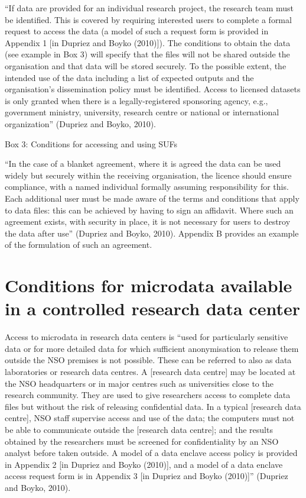 \documentclass[letterpaper,10pt,english]{sphinxmanual}
\begin{document}
“If data are provided for an individual research project, the research
team must be identified. This is covered by requiring interested users
to complete a formal request to access the data (a model of such a
request form is provided in Appendix 1 {[}in Dupriez and Boyko (2010){]}).
The conditions to obtain the data (see example in Box 3) will specify
that the files will not be shared outside the organisation and that data
will be stored securely. To the possible extent, the intended use of the
data \textendash{} including a list of expected outputs and the organisation’s
dissemination policy \textendash{} must be identified. Access to licensed datasets
is only granted when there is a legally-registered sponsoring agency,
e.g., government ministry, university, research centre or national or
international organization” (Dupriez and Boyko, 2010).

Box 3: Conditions for accessing and using SUFs


“In the case of a blanket agreement, where it is agreed the data can be
used widely but securely within the receiving organisation, the licence
should ensure compliance, with a named individual formally assuming
responsibility for this. Each additional user must be made aware of the
terms and conditions that apply to data files: this can be achieved by
having to sign an affidavit. Where such an agreement exists, with
security in place, it is not necessary for users to destroy the data
after use” (Dupriez and Boyko, 2010). Appendix B provides an example of
the formulation of such an agreement.


\section{Conditions for microdata available in a controlled research data center}
\label{\detokenize{SDC_intro:conditions-for-microdata-available-in-a-controlled-research-data-center}}
Access to microdata in research data centers is “used for particularly
sensitive data or for more detailed data for which sufficient
anonymisation to release them outside the NSO premises is not possible.
These can be referred to also as data laboratories or research data
centres. A {[}research data centre{]} may be located at the NSO headquarters
or in major centres such as universities close to the research
community. They are used to give researchers access to complete data
files but without the risk of releasing confidential data. In a typical
{[}research data centre{]}, NSO staff supervise access and use of the data;
the computers must not be able to communicate outside the {[}research data
centre{]}; and the results obtained by the researchers must be screened
for confidentiality by an NSO analyst before taken outside. A model of a
data enclave access policy is provided in Appendix 2 {[}in Dupriez and
Boyko (2010){]}, and a model of a data enclave access request form is in
Appendix 3 {[}in Dupriez and Boyko (2010){]}” (Dupriez and Boyko, 2010).
\end{document}
